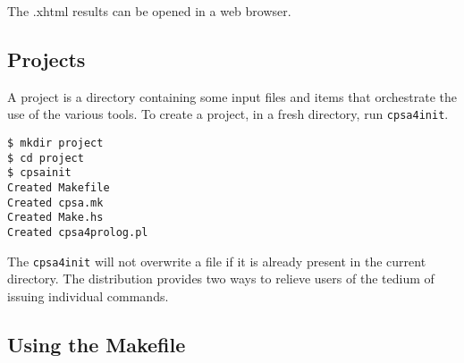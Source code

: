 The .xhtml results can be opened in a web browser.

\subsection{{\cpsa} Projects}\label{sec:cpsainit}

A {\cpsa} project is a directory containing some {\cpsa} input files
and items that orchestrate the use of the various {\cpsa} tools.  To
create a project, in a fresh directory, run \texttt{cpsa4init}.

\begin{verbatim}
$ mkdir project
$ cd project
$ cpsainit
Created Makefile
Created cpsa.mk
Created Make.hs
Created cpsa4prolog.pl
\end{verbatim}

The \texttt{cpsa4init} will not overwrite a file if it is already
present in the current directory.  The distribution provides two ways
to relieve users of the tedium of issuing individual commands.

\subsection{Using the {\cpsa} Makefile}








